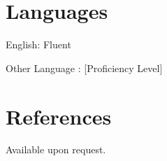     \section{Languages}

    \begin{onecolentry}
        \begin{highlights}
            \item English: Fluent
            \item [Other Language]: [Proficiency Level]
        \end{highlights}
    \end{onecolentry}

    \section{References}

    \begin{onecolentry}
        Available upon request.
    \end{onecolentry}

